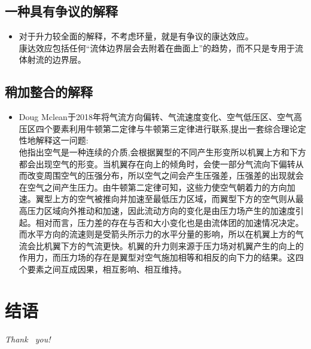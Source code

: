 \documentclass{beamer}
\begin{document}
		\subsection{一种具有争议的解释}
		\begin{frame}
		\begin{itemize}
			\item 对于升力较全面的解释，不考虑环量，就是有争议的康达效应。\\
			康达效应包括任何“流体边界层会去附着在曲面上”的趋势，而不只是专用于流体射流的边界层。
		\end{itemize}
		\end{frame}
		\subsection{稍加整合的解释}
		\begin{frame}
		\begin{itemize}
		\item  Doug Mclean于2018年将气流方向偏转、气流速度变化、空气低压区、空气高压区四个要素利用牛顿第二定律与牛顿第三定律进行联系,提出一套综合理论定性地解释这一问题:\\
		他指出空气是一种连续的介质,会根据翼型的不同产生形变所以机翼上方和下方都会出现空气的形变。当机翼存在向上的倾角时，会使一部分气流向下偏转从而改变周围空气的压强分布，所以空气之间会产生压强差，压强差的出现就会在空气之间产生压力。由牛顿第二定律可知，这些力使空气朝着力的方向加速。翼型上方的空气被推向并加速至最低压力区域，而翼型下方的空气则从最高压力区域向外推动和加速，因此流动方向的变化是由压力场产生的加速度引起。相对而言，压力差的存在与否和大小变化也是由流体团的加速情况决定。而水平方向的流速则是受箭头所示力的水平分量的影响，所以在机翼上方的气流会比机翼下方的气流更快。机翼的升力则来源于压力场对机翼产生的向上的作用力，而压力场的存在是翼型对空气施加相等和相反的向下力的结果。这四个要素之间互成因果，相互影响、相互维持。
		\end{itemize}
		\end{frame}

	\section{结语}
	\begin{frame}
		\begin{center}
			{\Huge \emph {\textrm{Thank  ~you!}}}
		\end{center}
	\end{frame}
\end{document}
